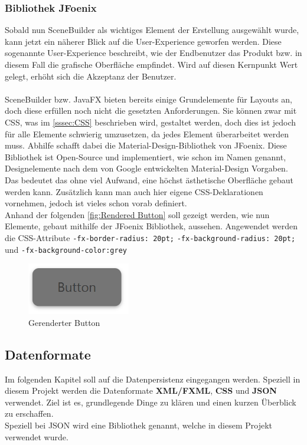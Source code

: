 \subsubsection{Bibliothek JFoenix}
Sobald nun SceneBuilder als wichtiges Element der Erstellung ausgewählt wurde, kann jetzt ein näherer Blick auf die User-Experience geworfen werden.
Diese sogenannte User-Experience beschreibt, wie der Endbenutzer das Produkt bzw. in diesem Fall die grafische Oberfläche empfindet.
Wird auf diesen Kernpunkt Wert gelegt, erhöht sich die Akzeptanz der Benutzer.\\\\
SceneBuilder bzw. JavaFX bieten bereits einige Grundelemente für Layouts an, doch diese erfüllen noch nicht die gesetzten Anforderungen.
Sie können zwar mit CSS, was im \autoref{sssec:CSS} beschrieben wird, gestaltet werden, doch dies ist jedoch für alle Elemente schwierig umzusetzen, da jedes Element überarbeitet werden muss.
Abhilfe schafft dabei die Material-Design-Bibliothek von JFoenix.
Diese Bibliothek ist Open-Source und implementiert, wie schon im Namen genannt, Designelemente nach dem von Google entwickelten Material-Design Vorgaben.
Das bedeutet das ohne viel Aufwand, eine höchst ästhetische Oberfläche gebaut werden kann.
Zusätzlich kann man auch hier eigene CSS-Deklarationen vornehmen, jedoch ist vieles schon vorab definiert.\\
Anhand der folgenden \autoref{fig:Rendered Button} soll gezeigt werden, wie nun Elemente, gebaut mithilfe der JFoenix Bibliothek, aussehen.
Angewendet werden die CSS-Attribute \lstinline{-fx-border-radius: 20pt;}  \lstinline{-fx-background-radius: 20pt;} und \lstinline{-fx-background-color:grey}
\begin{figure}[H]
    \centering
    \includegraphics[width=0.4\textwidth]{fig/ainf/RenderedButton.PNG}
    \caption{Gerenderter Button}
    \label{fig:Rendered Button}
\end{figure}
\subsection{Datenformate}\label{subsec:datenformate-in-java-fx}
Im folgenden Kapitel soll auf die Datenpersistenz eingegangen werden.
Speziell in diesem Projekt werden die Datenformate \textbf{XML/FXML}, \textbf{CSS} und \textbf{\acs{JSON}} verwendet.
Ziel ist es, grundlegende Dinge zu klären und einen kurzen Überblick zu erschaffen.\\
Speziell bei JSON wird eine Bibliothek genannt, welche in diesem Projekt verwendet wurde.
